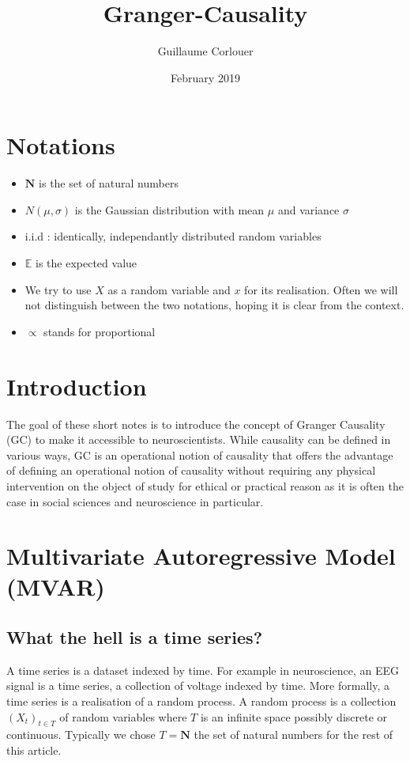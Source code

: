 \documentclass{article}
\title{Granger-Causality}
\author{Guillaume Corlouer}
\date{February 2019}
\begin{document}
\maketitle
\tableofcontents
\section{Notations}
\begin{itemize}
    \item $\mathbf{N}$ is the set of natural numbers
    \item $N(\mu,\sigma)$ is the Gaussian distribution with mean $\mu$ and variance $\sigma$
    \item i.i.d : identically, independantly distributed random variables
    \item $\mathds{E}$ is the expected value
    \item We try to use $X$ as a random variable and $x$ for its realisation. Often we will not distinguish between the two notations, hoping it is clear from the context.
    \item $\propto$ stands for proportional
\end{itemize}
\section{Introduction}
The goal of these short notes is to introduce the concept of Granger Causality (GC) to make it accessible to neuroscientists. While causality can be defined in various ways, GC is an operational notion of causality that offers the advantage of defining an operational notion of causality without requiring any physical intervention on the object of study for ethical or practical reason as it is often the case in social sciences and neuroscience in particular.  
\section{Multivariate Autoregressive Model (MVAR)}
\subsection{What the hell is a time series?}
A time series is a dataset indexed by time. For example in neuroscience, an EEG signal is a time series, a collection of voltage indexed by time. More formally, a time series is a realisation of a random process. A random process is a collection $(X_t)_{t\in T}$ of random variables where $T$ is an infinite space possibly discrete or continuous. Typically we chose $T=\mathbf{N}$ the set of natural numbers for the rest of this article. 
\end{document}
